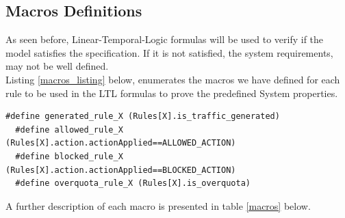 \subsection{Macros Definitions}
\noindent
As seen before, Linear-Temporal-Logic formulas will be used to verify if the model satisfies the specification. If it is not satisfied, the system requirements, may not be well defined.\\

Listing \ref{macros_listing} below, enumerates the macros we have defined for each rule to be used in the LTL formulas to prove the predefined System properties. 

\singlespacing
\begin{lstlisting}[caption=Macros for each rule,
  label=macros_listing]
  #define generated_rule_X (Rules[X].is_traffic_generated)
  #define allowed_rule_X (Rules[X].action.actionApplied==ALLOWED_ACTION)
  #define blocked_rule_X (Rules[X].action.actionApplied==BLOCKED_ACTION)
  #define overquota_rule_X (Rules[X].is_overquota)
\end{lstlisting} \bigskip
\doublespacing

A further description of each macro is presented in table \ref{macros} below.

\begin{table}[H]
\begin{center}
\end{center}
\caption{Macros Definitions}
\label{macros}
\end{table}

